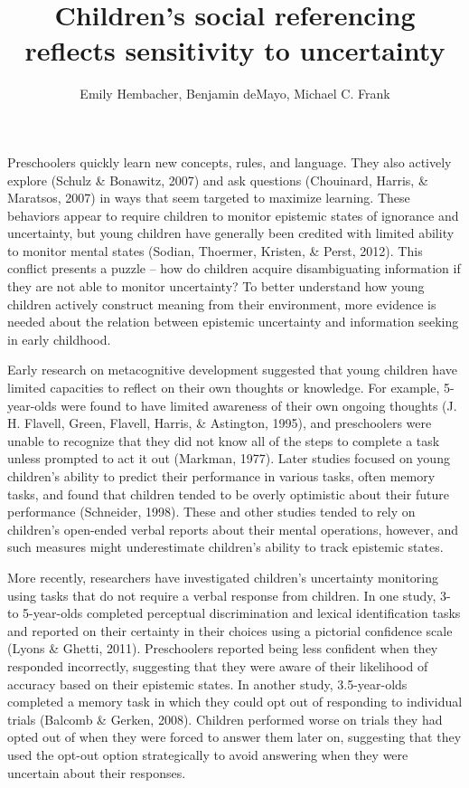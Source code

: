 \documentclass[a4paper,man,apacite,floatsintext]{apa6}
\date{}
\title{\textbf{Children's social referencing reflects sensitivity to uncertainty}}
\author{Emily Hembacher, Benjamin deMayo, Michael C. Frank}
\affiliation{Department of Psychology, Stanford University}
\begin{document}
\maketitle

Preschoolers quickly learn new concepts, rules, and language. They also
actively explore (Schulz \& Bonawitz, 2007) and ask questions
(Chouinard, Harris, \& Maratsos, 2007) in ways that seem targeted to
maximize learning. These behaviors appear to require children to monitor
epistemic states of ignorance and uncertainty, but young children have
generally been credited with limited ability to monitor mental states
(Sodian, Thoermer, Kristen, \& Perst, 2012). This conflict presents a
puzzle -- how do children acquire disambiguating information if they are
not able to monitor uncertainty? To better understand how young children
actively construct meaning from their environment, more evidence is
needed about the relation between epistemic uncertainty and information
seeking in early childhood.

Early research on metacognitive development suggested that young
children have limited capacities to reflect on their own thoughts or
knowledge. For example, 5-year-olds were found to have limited awareness
of their own ongoing thoughts (J. H. Flavell, Green, Flavell, Harris, \&
Astington, 1995), and preschoolers were unable to recognize that they
did not know all of the steps to complete a task unless prompted to act
it out (Markman, 1977). Later studies focused on young children's
ability to predict their performance in various tasks, often memory
tasks, and found that children tended to be overly optimistic about
their future performance (Schneider, 1998). These and other studies
tended to rely on children's open-ended verbal reports about their
mental operations, however, and such measures might underestimate
children's ability to track epistemic states.

More recently, researchers have investigated children's uncertainty
monitoring using tasks that do not require a verbal response from
children. In one study, 3- to 5-year-olds completed perceptual
discrimination and lexical identification tasks and reported on their
certainty in their choices using a pictorial confidence scale (Lyons \&
Ghetti, 2011). Preschoolers reported being less confident when they
responded incorrectly, suggesting that they were aware of their
likelihood of accuracy based on their epistemic states. In another
study, 3.5-year-olds completed a memory task in which they could opt out
of responding to individual trials (Balcomb \& Gerken, 2008). Children
performed worse on trials they had opted out of when they were forced to
answer them later on, suggesting that they used the opt-out option
strategically to avoid answering when they were uncertain about their
responses.
\end{document}
